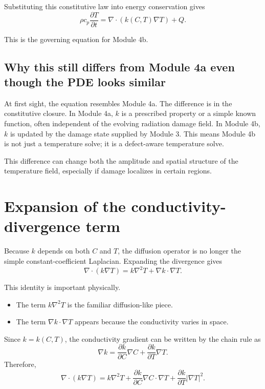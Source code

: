 \documentclass[11pt]{article}
\newcommand{\absval}[1]{\left\lvert #1 \right\rvert}
\begin{document}
Substituting this constitutive law into energy conservation gives
\begin{equation}
\rho c_p \frac{\partial T}{\partial t} = \nabla\cdot\left(k(C,T)\nabla T\right) + Q.
\end{equation}

This is the governing equation for Module 4b.

\subsection{Why this still differs from Module 4a even though the PDE looks similar}

At first sight, the equation resembles Module 4a. The difference is in the constitutive closure. In Module 4a, $k$ is a prescribed property or a simple known function, often independent of the evolving radiation damage field. In Module 4b, $k$ is updated by the damage state supplied by Module 3. This means Module 4b is not just a temperature solve; it is a defect-aware temperature solve.

This difference can change both the amplitude and spatial structure of the temperature field, especially if damage localizes in certain regions.

\section{Expansion of the conductivity-divergence term}

Because $k$ depends on both $C$ and $T$, the diffusion operator is no longer the simple constant-coefficient Laplacian. Expanding the divergence gives
\begin{equation}
\nabla\cdot\left(k\nabla T\right) = k\nabla^2 T + \nabla k \cdot \nabla T.
\end{equation}

This identity is important physically.

\begin{itemize}
    \item The term $k\nabla^2 T$ is the familiar diffusion-like piece.
    \item The term $\nabla k \cdot \nabla T$ appears because the conductivity varies in space.
\end{itemize}

Since $k=k(C,T)$, the conductivity gradient can be written by the chain rule as
\begin{equation}
\nabla k = \frac{\partial k}{\partial C}\nabla C + \frac{\partial k}{\partial T}\nabla T.
\end{equation}
Therefore,
\begin{equation}
\nabla\cdot\left(k\nabla T\right) = k\nabla^2 T + \frac{\partial k}{\partial C}\nabla C\cdot\nabla T + \frac{\partial k}{\partial T}\absval{\nabla T}^2.
\end{equation}
\end{document}
